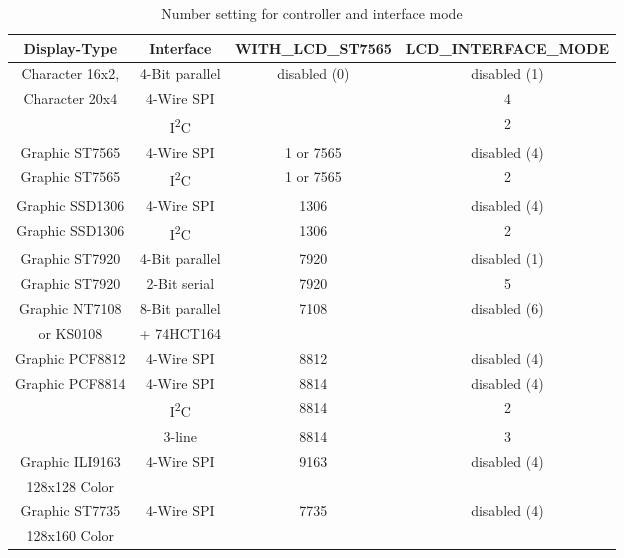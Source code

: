 \begin{description}
\begin{table}[H]
  \begin{center}
    \begin{tabular}{| c | c | c | c|}
    \hline
 Display-Type       &  Interface       & WITH\_LCD\_ST7565 &  LCD\_INTERFACE\_MODE \\
    \hline
    \hline
  Character 16x2,   & 4-Bit parallel   &  disabled (0)     & disabled (1) \\
  Character 20x4    &  4-Wire SPI       &                   &    4   \\
                  & I\textsuperscript{2}C &                &   2    \\
    \hline
  Graphic ST7565    & 4-Wire SPI        &   1 or 7565       &  disabled (4) \\
    \hline
  Graphic ST7565  & I\textsuperscript{2}C & 1 or 7565      &   2 \\
    \hline
  Graphic SSD1306   & 4-Wire SPI        &   1306            &  disabled (4) \\
    \hline
  Graphic SSD1306  & I\textsuperscript{2}C & 1306          &   2 \\
    \hline
  Graphic ST7920    & 4-Bit parallel   &   7920            &  disabled (1) \\
    \hline
  Graphic ST7920    & 2-Bit serial     &   7920            &  5 \\
    \hline
  Graphic NT7108    & 8-Bit parallel   &   7108            &  disabled (6) \\
    or KS0108       &    + 74HCT164    &                   &      \\
    \hline
  Graphic PCF8812   & 4-Wire SPI       &   8812            & disabled (4) \\
    \hline
  Graphic PCF8814   & 4-Wire SPI       &   8814            & disabled (4) \\
                  & I\textsuperscript{2}C & 8814           &   2 \\
                    & 3-line           &   8814            &   3 \\
    \hline
  Graphic ILI9163   & 4-Wire SPI       & 9163              & disabled (4) \\
  128x128 Color     &                 &                   &              \\
    \hline
  Graphic ST7735    & 4-Wire SPI       & 7735              & disabled (4) \\
  128x160 Color     &                 &                   &              \\
    \hline
    \end{tabular}
  \end{center}
  \caption{Number setting for controller and interface mode}
  \label{tab:cod-display}
\end{table}


\end{description}
